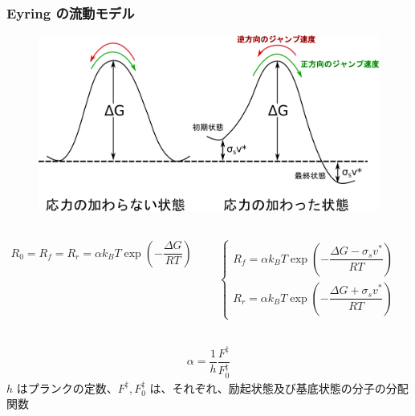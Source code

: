 \documentclass[10pt, dvipdfmx]{beamer}
\begin{document}
\begin{frame}
\frametitle{Eyring の流動モデル}
    \begin{figure}
    \centering
        \includegraphics[width=.5\textwidth]{flow_under_stress.png}
    \end{figure}
    \footnotesize
    \begin{columns}[totalwidth=.8\textwidth]
            \begin{align*}
            R_0 = R_f = R_r = \alpha k_B T \exp \left( - \dfrac{\Delta G}{RT} \right)
            \end{align*}

            \begin{align*}
            \begin{cases}
            R_f = \alpha k_B T \exp \left( - \dfrac{\Delta G - \sigma_s v^*}{RT} \right)\\[12pt]
            R_r = \alpha k_B T \exp \left( - \dfrac{\Delta G + \sigma_s v^*}{RT} \right)
            \end{cases}
            \end{align*}
	\end{columns}
	
	\begin{align*}
	\alpha = \dfrac{1}{h} \dfrac{F^{\ddag}}{F_0^{\ddag}} 
	\end{align*}
	$h$ はプランクの定数、$F^{\ddag}, F_0^{\ddag}$ は、それぞれ、励起状態及び基底状態の分子の分配関数
\end{frame}
\end{document}
